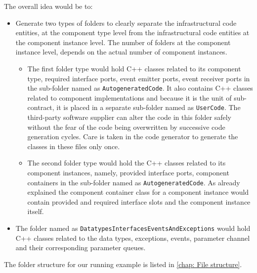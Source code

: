The overall idea would be to:
\begin{itemize}
\item Generate two types of folders to clearly separate the infrastructural code entities, at the component type level from the infrastructural code entities at the component instance level. The number of folders at the component instance level, depends on the actual number of component instances.   
\begin{itemize}
\item The first folder type would hold C++ classes related to its component type, required interface ports, event emitter ports, event receiver ports in the sub-folder named as \texttt{AutogeneratedCode}. It also contains C++ classes related to component implementations and because it is the unit of sub-contract, it is placed in a separate sub-folder named as \texttt{UserCode}. The third-party software supplier can alter the code in this folder safely without the fear of the code being overwritten by successive code generation cycles. Care is taken in the code generator to generate the classes in these files only once. 
\item The second folder type would hold the C++ classes related to its component instances, namely, provided interface ports, component containers in the sub-folder named as \texttt{AutogeneratedCode}. As already explained the component container class for a component instance would contain provided and required interface slots and the component instance itself.   
\end{itemize} 
\item The folder named as \texttt{Datatypes\allowbreak Interfaces\allowbreak EventsAnd\allowbreak Exceptions} would hold C++ classes related to the data types, exceptions, events, parameter channel and their corresponding parameter queues. 
\end{itemize}

The folder structure for our running example is listed in \cref{chap: File structure}.
  



 

   

 


 
   



 


 
